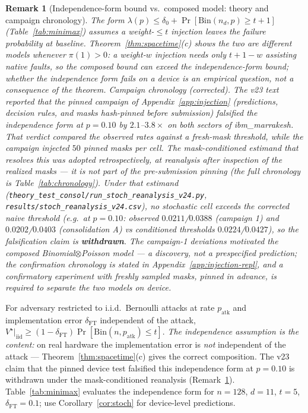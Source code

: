 \documentclass[11pt,a4paper]{article}
\newtheorem{remark}{Remark}
\begin{document}
\begin{remark}[Independence-form bound vs.\ composed model: theory and
campaign chronology]
\label{rem:naive-false}
The form $\lambda(p)\le\delta_0+\Pr[\mathrm{Bin}(n_d,p)\ge t{+}1]$
(Table~\ref{tab:minimax}) assumes a weight-$\le t$ injection leaves the
failure probability at baseline. Theorem~\ref{thm:spacetime}(c) shows
the two are \emph{different models} whenever $\pi(1)>0$: a weight-$w$
injection needs only $t{+}1{-}w$ assisting native faults, so the
composed bound can exceed the independence-form bound; whether the
independence form fails on a device is an empirical question, not a
consequence of the theorem.
\emph{Campaign chronology (corrected).} The v23 text reported that the
pinned campaign of Appendix~\ref{app:injection} (predictions, decision
rules, and masks hash-pinned before submission) falsified the
independence form at $p=0.10$ by $2.1$--$3.8\times$ on both sectors of
ibm\_marrakesh. That verdict compared the observed rates against a
fresh-mask threshold, while the campaign injected $50$ \emph{pinned}
masks per cell. The mask-conditioned estimand that resolves this was
adopted \emph{retrospectively}, at reanalysis after inspection of the
realized masks --- it is not part of the pre-submission pinning (the
full chronology is Table~\ref{tab:chronology}). Under that estimand
(\texttt{theory\_test\_consol/run\_stoch\_reanalysis\_v24.py},
\texttt{results/stoch\_reanalysis\_v24.csv}), no stochastic cell exceeds
the corrected naive threshold (e.g.\ at $p=0.10$: observed
$0.0211$/$0.0388$ (campaign 1) and $0.0202$/$0.0403$ (consolidation A)
vs conditioned thresholds $0.0224$/$0.0427$), so the falsification claim
is \textbf{withdrawn}. The campaign-1 deviations \emph{motivated} the
composed Binomial$\otimes$Poisson model --- a discovery, not a
prespecified prediction; the confirmation chronology is stated in
Appendix~\ref{app:injection-repl}, and a confirmatory
experiment with freshly sampled masks, pinned in advance, is required to
separate the two models on device.
\end{remark}

\begin{proposition}\label{prop:stochastic}
For adversary restricted to i.i.d.\ Bernoulli attacks at rate $p_\mathrm{atk}$
and implementation error $\delta_\mathrm{FT}$ independent of the attack,
$V^\star|_\mathrm{iid}\ge(1-\delta_\mathrm{FT})\Pr[\mathrm{Bin}(n,p_\mathrm{atk})\le t]$.
\emph{The independence assumption is the content:} on real hardware the
implementation error is \emph{not} independent of the attack ---
Theorem~\ref{thm:spacetime}(c) gives the correct composition. The v23
claim that the pinned device test falsified this independence
form at $p=0.10$ is withdrawn under the mask-conditioned reanalysis
(Remark~\ref{rem:naive-false}).
Table~\ref{tab:minimax} evaluates the independence form for $n=128$,
$d=11$, $t=5$, $\delta_\mathrm{FT}=0.1$; use
Corollary~\ref{cor:stoch} for device-level predictions.
\end{proposition}
\end{document}

